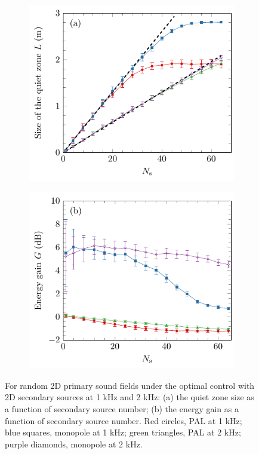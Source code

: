 \begin{figure}[!htb]
    \centering
    \begin{subfigure}{0.49\textwidth}
        \centering
        \includegraphics[width = \textwidth]{fig/200407A_size_v2.pdf}
    \end{subfigure}
    \begin{subfigure}{0.49\textwidth}
        \centering
        \includegraphics[width = \textwidth]{fig/200407A_gain_v2.pdf}
    \end{subfigure}
    \caption{For random 2D primary sound fields under the optimal control with 2D secondary sources at 1 kHz and 2 kHz: (a) the quiet zone size as a function of secondary source number; (b) the energy gain as a function of secondary source number. Red circles, PAL at 1 kHz; blue squares, monopole at 1 kHz; green triangles, PAL at 2 kHz; purple diamonds, monopole at 2 kHz.}
    \label{fig:ancpalqz:qz_eg:rand:2d}
\end{figure}

